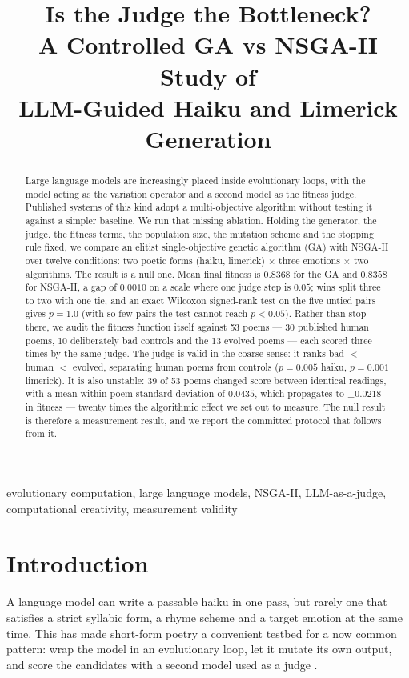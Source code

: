 \documentclass[conference]{IEEEtran}
\title{Is the Judge the Bottleneck?\\ A Controlled GA vs NSGA-II Study of\\ LLM-Guided Haiku and Limerick Generation}
\author{%
\IEEEauthorblockN{Sakthi C R}
\IEEEauthorblockA{\textit{M.Tech Artificial Intelligence}\\
\textit{Amrita School of Computing, Coimbatore}\\
\textit{Amrita Vishwa Vidyapeetham, India}}
\and
\IEEEauthorblockN{Bagavathi C.}
\IEEEauthorblockA{\textit{Assistant Professor (Sr. Gd.)}\\
\textit{Dept.\ of Computer Science and Engineering}\\
\textit{Amrita School of Computing, Coimbatore}\\
\textit{Amrita Vishwa Vidyapeetham, India}}}
\begin{document}
\maketitle

\begin{abstract}
Large language models are increasingly placed inside evolutionary loops, with
the model acting as the variation operator and a second model as the fitness
judge. Published systems of this kind adopt a multi-objective algorithm without
testing it against a simpler baseline. We run that missing ablation. Holding the
generator, the judge, the fitness terms, the population size, the mutation scheme
and the stopping rule fixed, we compare an elitist single-objective genetic
algorithm (GA) with NSGA-II over twelve conditions: two poetic forms (haiku,
limerick) $\times$ three emotions $\times$ two algorithms. The result is a null
one. Mean final fitness is $0.8368$ for the GA and $0.8358$ for NSGA-II, a gap of
$0.0010$ on a scale where one judge step is $0.05$; wins split three to two with
one tie, and an exact Wilcoxon signed-rank test on the five untied pairs gives
$p=1.0$ (with so few pairs the test cannot reach $p<0.05$). Rather than stop
there, we audit the fitness function itself against 53 poems --- 30 published
human poems, 10 deliberately bad controls and the 13 evolved poems --- each
scored three times by the same judge. The judge is valid in the coarse sense: it
ranks bad $<$ human $<$ evolved, separating human poems from controls
($p=0.005$ haiku, $p=0.001$ limerick). It is also unstable: 39 of 53 poems
changed score between identical readings, with a mean within-poem standard
deviation of $0.0435$, which propagates to $\pm 0.0218$ in fitness --- twenty
times the algorithmic effect we set out to measure. The null result is therefore
a measurement result, and we report the committed protocol that follows from it.
\end{abstract}

\begin{IEEEkeywords}
evolutionary computation, large language models, NSGA-II, LLM-as-a-judge,
computational creativity, measurement validity
\end{IEEEkeywords}

\section{Introduction}
A language model can write a passable haiku in one pass, but rarely one that
satisfies a strict syllabic form, a rhyme scheme and a target emotion at the same
time. This has made short-form poetry a convenient testbed for a now common
pattern: wrap the model in an evolutionary loop, let it mutate its own output,
and score the candidates with a second model used as a judge
\cite{lehman2022,meyerson2024,bradley2024}.
\end{document}
